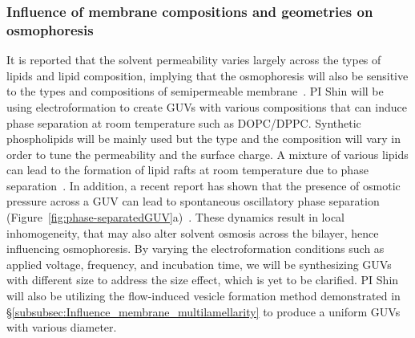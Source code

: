 \documentclass[11pt]{article}
\begin{document}
\subsubsection{Influence of membrane compositions and geometries on
osmophoresis}
\label{subsubsec:influence_membrane_compositions}
It is reported that the solvent permeability varies largely across the
types of lipids and lipid composition, implying that the osmophoresis
will also be sensitive to the types and compositions of semipermeable
membrane~\cite{fettiplace1980, olbrich2000}.  PI Shin will be using
electroformation to create GUVs with various compositions that can
induce phase separation at room temperature such as DOPC/DPPC.
Synthetic phospholipids will be mainly used but the type and the
composition will vary in order to tune the permeability and the surface
charge.  A mixture of various lipids can lead to the formation of lipid
rafts at room temperature due to phase separation~\cite{veatch2003}.  In
addition, a recent report has shown that the presence of osmotic
pressure across a GUV can lead to spontaneous oscillatory phase
separation (Figure~\ref{fig:phase-separatedGUV}a)~\cite{oglkecka2014}.
These dynamics result in local inhomogeneity, that may also alter
solvent osmosis across the bilayer, hence influencing osmophoresis.  By
varying the electroformation conditions such as applied voltage,
frequency, and incubation time, we will be synthesizing GUVs with
different size to address the size effect, which is yet to be clarified.
PI Shin will also be utilizing the flow-induced vesicle formation method
demonstrated in \S\ref{subsubsec:Influence_membrane_multilamellarity} to
produce a uniform GUVs with various diameter.


\end{document}
